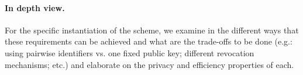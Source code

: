\paragraph{In depth view.} 
For the specific instantiation of the scheme, we examine 
in 
the different ways that these requirements can be achieved and what are the trade-offs to be done (e.g.: using pairwise identifiers vs. one fixed public key; different revocation mechanisms; etc.) and elaborate on the privacy and efficiency properties of each. 




\newcommand{\begminB}[1]{\begmin{#1}\setlist[itemize]{leftmargin=1.5ex}\renewcommand{\labelitemi}{-}}
\newenvironment{funcprivtabular}[5]{\begin{center}\footnotesize\begin{longtable}{|>{\begminB{#1}}l<{\myendmini}|>{\begminB{#2}}l<{\myendmini}|>{\begminB{#3}}l<{\myendmini}|>{\begminB{#4}}l<{\myendmini}|>{\begmin{#5}}l|}\hline }{\end{longtable}\vspace{1em}\end{center}}

